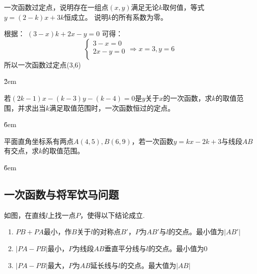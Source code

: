\begin{solution}
    一次函数过定点，说明存在一组点$(x,y)$满足无论$k$取何值，等式$y=(2-k)x+3k$恒成立。
    说明$k$的所有系数为零。

    根据：
    $(3-x)k+2x-y=0$
    可得：
    $$\begin{cases}
            3-x=0  \\
            2x-y=0 \\
        \end{cases} \Rightarrow x=3,y=6$$
    所以一次函数过定点(3,6)
\end{solution}

\v{2em}

\begin{example}
    若$(2k-1)x-(k-3)y-(k-4)=0$是$y$关于$x$的一次函数，求$k$的取值范围，并求出当$k$满足取值范围时，一次函数恒过的定点。
\end{example}

\v{6em}

\begin{example}
    平面直角坐标系有两点$A(4,5),B(6,9)$，若一次函数$y=kx-2k+3$与线段$AB$有交点，求$k$的取值范围。
\end{example}

\v{6em}

\subsection{一次函数与将军饮马问题}

\begin{theorem}
    如图，在直线$l$上找一点$P$，使得以下结论成立.
    \begin{enumerate}
        \item $PB+PA$最小，作$B$关于$l$的对称点$B'$，$P$为$AB'$与$l$的交点。最小值为$|AB'|$
        \item $|PA-PB|$最小，$P$为线段$AB$垂直平分线与$l$的交点。最小值为0
        \item $|PA-PB|$最大，$P$为$AB$延长线与$l$的交点。最大值为$|AB|$
    \end{enumerate}

    \begin{center}
    \end{center}
\end{theorem}


